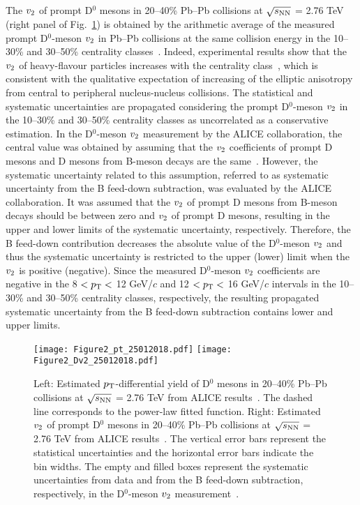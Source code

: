 \documentclass[11pt,a4paper]{article}
\providecommand{\vtwo}{$v_{\rm 2}$ }
\providecommand{\snn}{$\sqrt{s_{\rm NN}}$ }
\begin{document}
The \vtwo of prompt D$^{0}$ mesons in 20--40\% Pb--Pb collisions at \snn = 2.76 TeV (right panel of Fig.~\ref{fig:CockInput}) is obtained by the  arithmetic average  of the measured prompt D$^0$-meson  \vtwo in Pb--Pb collisions at the same collision energy in the 10--30\% and 30--50\% centrality classes~\cite{Abelev:2014ipa}. Indeed, experimental results show that the \vtwo of heavy-flavour particles increases with the centrality class~\cite{Abelev:2014ipa, Adare:2010de, Adam:2016ssk,Adam:2015pga}, which is consistent with the qualitative expectation of increasing of the elliptic anisotropy from central to peripheral nucleus-nucleus collisions.
The statistical and systematic uncertainties are propagated considering the prompt D$^0$-meson  \vtwo  in the 10--30\% and 30--50\% centrality classes as uncorrelated as a conservative estimation.
In the D$^0$-meson \vtwo measurement by the ALICE collaboration, the central value was obtained by assuming that  the \vtwo coefficients of prompt D mesons and D mesons from B-meson decays are the same~\cite{Abelev:2014ipa}. However, the systematic uncertainty related to this assumption, referred to as systematic uncertainty from the B feed-down subtraction, was evaluated by the ALICE collaboration. It was assumed that the 
\vtwo of prompt D mesons from B-meson decays should be between zero and \vtwo of prompt D mesons, resulting in the upper and lower limits of the systematic uncertainty, respectively. Therefore, the B feed-down contribution decreases the absolute value of the D$^0$-meson \vtwo and thus the systematic uncertainty is restricted to the upper (lower) limit when the \vtwo is positive (negative). Since the measured D$^0$-meson \vtwo coefficients are negative in the 8 $< p_{\rm T} <$ 12 GeV/$c$ and 12 $< p_{\rm T} <$ 16 GeV/$c$ intervals in the 10--30\% and 30--50\% centrality classes, respectively, the resulting propagated systematic uncertainty from the B feed-down subtraction contains lower and upper limits.


\begin{figure}
\centering
  \texttt{[image: Figure2\_pt\_25012018.pdf]}
    \texttt{[image: Figure2\_Dv2\_25012018.pdf]}
  \caption{Left:  Estimated $p_{\rm T}$-differential yield of D$^{0}$ mesons  in 20--40\%   Pb--Pb collisions at \snn = 2.76 TeV from ALICE results~\cite{ALICEDRPbPb}. The dashed line corresponds to the power-law fitted function. Right:  Estimated \vtwo of prompt D$^{0}$ mesons  in 20--40\%   Pb--Pb collisions at \snn = 2.76 TeV from ALICE results~\cite{Abelev:2014ipa}. The vertical error bars represent the statistical uncertainties and the horizontal error bars indicate the bin widths. The empty and filled boxes represent the systematic uncertainties from data and from the B feed-down subtraction, respectively, in the D$^0$-meson \vtwo measurement~\cite{Abelev:2014ipa}.}
   \label{fig:CockInput}
\end{figure}
\end{document}
